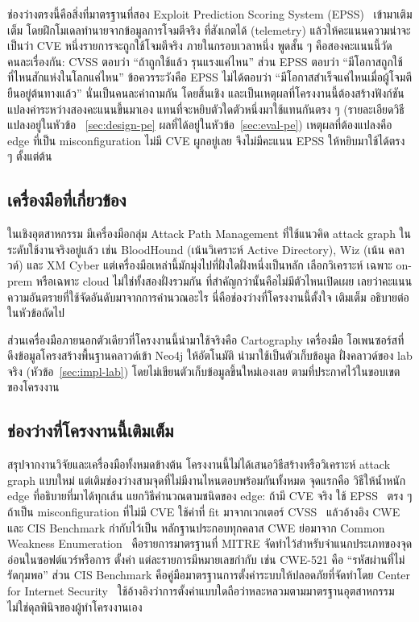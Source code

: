 ช่องว่างตรงนี้คือสิ่งที่มาตรฐานที่สอง Exploit Prediction Scoring System
(EPSS)~\cite{jacobs2019,epss} เข้ามาเติมเต็ม โดยฝึกโมเดลทำนายจากข้อมูลการโจมตีจริง
ที่สังเกตได้ (telemetry) แล้วให้คะแนนความน่าจะเป็นว่า CVE หนึ่งรายการจะถูกใช้โจมตีจริง
ภายในกรอบเวลาหนึ่ง พูดสั้น ๆ คือสองคะแนนนี้วัดคนละเรื่องกัน: CVSS ตอบว่า ``ถ้าถูกใช้แล้ว
รุนแรงแค่ไหน'' ส่วน EPSS ตอบว่า ``มีโอกาสถูกใช้ที่ไหนสักแห่งในโลกแค่ไหน'' ข้อควรระวังคือ
EPSS ไม่ได้ตอบว่า ``มีโอกาสสำเร็จแค่ไหนเมื่อผู้โจมตียืนอยู่ต้นทางแล้ว'' นั่นเป็นคนละคำถามกัน
โดยสิ้นเชิง และเป็นเหตุผลที่โครงงานนี้ต้องสร้างฟังก์ชันแปลงค่าระหว่างสองคะแนนขึ้นมาเอง
แทนที่จะหยิบตัวใดตัวหนึ่งมาใช้แทนกันตรง ๆ (รายละเอียดวิธีแปลงอยู่ในหัวข้อ~
\ref{sec:design-pe} ผลที่ได้อยู่ในหัวข้อ~\ref{sec:eval-pe}) เหตุผลที่ต้องแปลงคือ edge ที่เป็น
misconfiguration ไม่มี CVE ผูกอยู่เลย จึงไม่มีคะแนน EPSS ให้หยิบมาใช้ได้ตรง ๆ ตั้งแต่ต้น

\subsection{เครื่องมือที่เกี่ยวข้อง}\label{sec:theory-tools}

ในเชิงอุตสาหกรรม มีเครื่องมือกลุ่ม Attack Path Management ที่ใช้แนวคิด attack graph
ในระดับใช้งานจริงอยู่แล้ว เช่น BloodHound (เน้นวิเคราะห์ Active Directory), Wiz (เน้น
คลาวด์) และ XM Cyber แต่เครื่องมือเหล่านี้มักมุ่งไปที่ฝั่งใดฝั่งหนึ่งเป็นหลัก เลือกวิเคราะห์
เฉพาะ on-prem หรือเฉพาะ cloud ไม่ใช่ทั้งสองฝั่งรวมกัน ที่สำคัญกว่านั้นคือไม่มีตัวไหนเปิดเผย
เลยว่าคะแนนความอันตรายที่ใช้จัดอันดับมาจากการคำนวณอะไร นี่คือช่องว่างที่โครงงานนี้ตั้งใจ
เติมเต็ม อธิบายต่อในหัวข้อถัดไป

ส่วนเครื่องมือภายนอกตัวเดียวที่โครงงานนี้นำมาใช้จริงคือ Cartography เครื่องมือ
โอเพนซอร์สที่ดึงข้อมูลโครงสร้างพื้นฐานคลาวด์เข้า Neo4j ให้อัตโนมัติ นำมาใช้เป็นตัวเก็บข้อมูล
ฝั่งคลาวด์ของ lab จริง (หัวข้อ~\ref{sec:impl-lab}) โดยไม่เขียนตัวเก็บข้อมูลขึ้นใหม่เองเลย
ตามที่ประกาศไว้ในขอบเขตของโครงงาน

\subsection{ช่องว่างที่โครงงานนี้เติมเต็ม}\label{sec:theory-gap}

สรุปจากงานวิจัยและเครื่องมือทั้งหมดข้างต้น โครงงานนี้ไม่ได้เสนอวิธีสร้างหรือวิเคราะห์
attack graph แบบใหม่ แต่เติมช่องว่างสามจุดที่ไม่มีงานไหนตอบพร้อมกันทั้งหมด จุดแรกคือ
วิธีให้น้ำหนัก edge ที่อธิบายที่มาได้ทุกเส้น แยกวิธีคำนวณตามชนิดของ edge: ถ้ามี CVE จริง
ใช้ EPSS~\cite{jacobs2019,epss} ตรง ๆ ถ้าเป็น misconfiguration ที่ไม่มี CVE ใช้ค่าที่
fit มาจากเวกเตอร์ CVSS~\cite{cvss31} แล้วอ้างอิง CWE และ CIS Benchmark กำกับไว้เป็น
หลักฐานประกอบทุกคลาส CWE ย่อมาจาก Common Weakness Enumeration~\cite{cwe}
คือรายการมาตรฐานที่ MITRE จัดทำไว้สำหรับจำแนกประเภทของจุดอ่อนในซอฟต์แวร์หรือการ
ตั้งค่า แต่ละรายการมีหมายเลขกำกับ เช่น CWE-521 คือ ``รหัสผ่านที่ไม่รัดกุมพอ'' ส่วน CIS
Benchmark คือคู่มือมาตรฐานการตั้งค่าระบบให้ปลอดภัยที่จัดทำโดย Center for Internet
Security~\cite{cis} ใช้อ้างอิงว่าการตั้งค่าแบบใดถือว่าหละหลวมตามมาตรฐานอุตสาหกรรม
ไม่ใช่ดุลพินิจของผู้ทำโครงงานเอง

